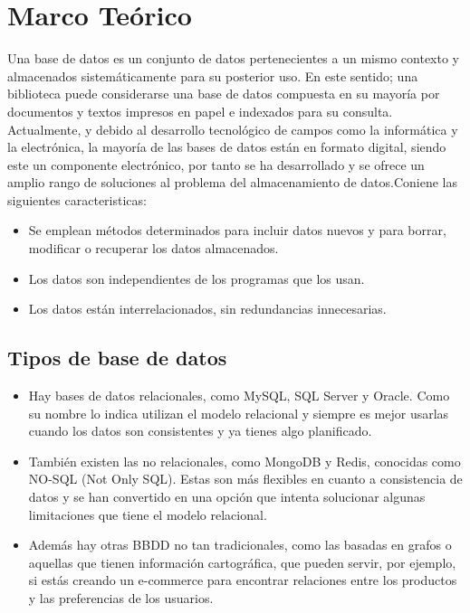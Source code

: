 \documentclass[%
 reprint,
 amsmath,amssymb,
 aps,
]{revtex4-1}
\begin{document}
\section{Marco Teórico}\label{sec:3}
Una base de datos es un conjunto de datos pertenecientes a un mismo contexto y almacenados sistemáticamente para su posterior uso. En este sentido; una biblioteca puede considerarse una base de datos compuesta en su mayoría por documentos y textos impresos en papel e indexados para su consulta. Actualmente, y debido al desarrollo tecnológico de campos como la informática y la electrónica, la mayoría de las bases de datos están en formato digital, siendo este un componente electrónico, por tanto se ha desarrollado y se ofrece un amplio rango de soluciones al problema del almacenamiento de datos.Coniene las siguientes caracteristicas:
\begin{itemize}
	\item Se emplean métodos determinados para incluir datos nuevos y para borrar, modificar o recuperar los datos almacenados.
	\item Los datos son independientes de los programas que los usan.
	\item Los datos están interrelacionados, sin redundancias innecesarias.
\end{itemize}
\subsection{Tipos de base de datos}
	          \begin{itemize}
		\item Hay bases de datos relacionales, como MySQL, SQL Server y Oracle. Como su nombre lo indica utilizan el modelo relacional y siempre es mejor usarlas cuando los datos son consistentes y ya tienes algo planificado.
                     \item También existen las no relacionales, como MongoDB y Redis, conocidas como NO-SQL (Not Only SQL). Estas son más flexibles en cuanto a consistencia de datos y se han convertido en una opción que intenta solucionar algunas limitaciones que tiene el modelo relacional.
		\item Además hay otras BBDD no tan tradicionales, como las basadas en grafos o aquellas que tienen información cartográfica, que pueden servir, por ejemplo, si estás creando un e-commerce para encontrar relaciones entre los productos y las preferencias de los usuarios.
	           \end{itemize}
\end{document}
